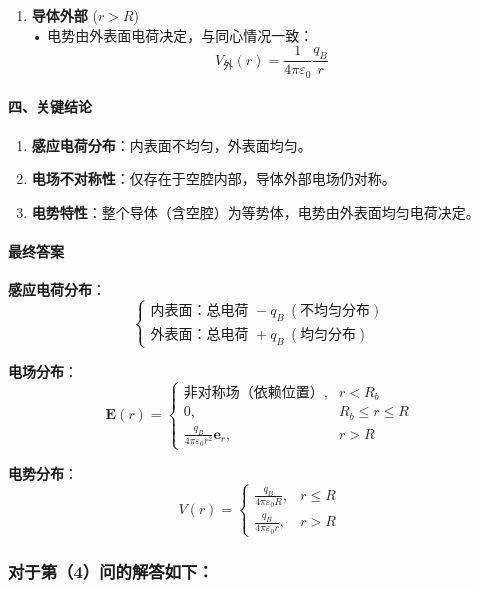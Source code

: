 \documentclass{article}
\begin{document}
{\begin{enumerate}
    \item \textbf{导体外部} (\(r > R\))  \\
    • 电势由外表面电荷决定，与同心情况一致：  
    \[
    V_\text{外}(r) = \frac{1}{4\pi\varepsilon_0} \frac{q_B}{r}
    \]
\end{enumerate}



\paragraph*{四、关键结论}

\begin{enumerate}
    \item \textbf{感应电荷分布}：内表面不均匀，外表面均匀。  
    \item \textbf{电场不对称性}：仅存在于空腔内部，导体外部电场仍对称。  
    \item \textbf{电势特性}：整个导体（含空腔）为等势体，电势由外表面均匀电荷决定。
\end{enumerate}



\paragraph*{最终答案}

\textbf{感应电荷分布}：  \\
\[
\boxed{
\begin{cases}
\text{内表面：总电荷 } -q_B \ (\text{不均匀分布}) \\
\text{外表面：总电荷 } +q_B \ (\text{均匀分布})
\end{cases}
}
\]

\textbf{电场分布}：  \\
\[
\boxed{
\mathbf{E}(r) = 
\begin{cases}
\text{非对称场（依赖位置）}, & r < R_b \\
0, & R_b \leq r \leq R \\
\displaystyle \frac{q_B}{4\pi\varepsilon_0 r^2} \mathbf{e}_r, & r > R
\end{cases}
}
\]

\textbf{电势分布}：  \\
\[
\boxed{
V(r) = 
\begin{cases}
\displaystyle \frac{q_B}{4\pi\varepsilon_0 R}, & r \leq R \\
\displaystyle \frac{q_B}{4\pi\varepsilon_0 r}, & r > R
\end{cases}
}
\]

\subsubsection*{对于第（4）问的解答如下：}


}
\end{document}
